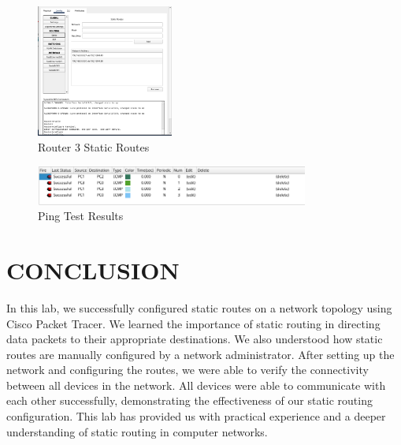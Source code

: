 \documentclass[a4paper,12pt]{article}
\begin{document}
\begin{figure}[h!]
    \centering
    \includegraphics[width=0.4\textwidth]{img/router3.png}
    \caption{Router 3 Static Routes}
\end{figure}

\begin{figure}[h!]
    \centering
    \includegraphics[width=0.8\textwidth]{img/ping.png}
    \caption{Ping Test Results}
\end{figure}

\newpage
\section*{CONCLUSION}
In this lab, we successfully configured static routes on a network topology using Cisco Packet Tracer. We learned the importance of static routing in directing data packets to their appropriate destinations. We also understood how static routes are manually configured by a network administrator. After setting up the network and configuring the routes, we were able to verify the connectivity between all devices in the network. All devices were able to communicate with each other successfully, demonstrating the effectiveness of our static routing configuration. This lab has provided us with practical experience and a deeper understanding of static routing in computer networks.
\end{document}
